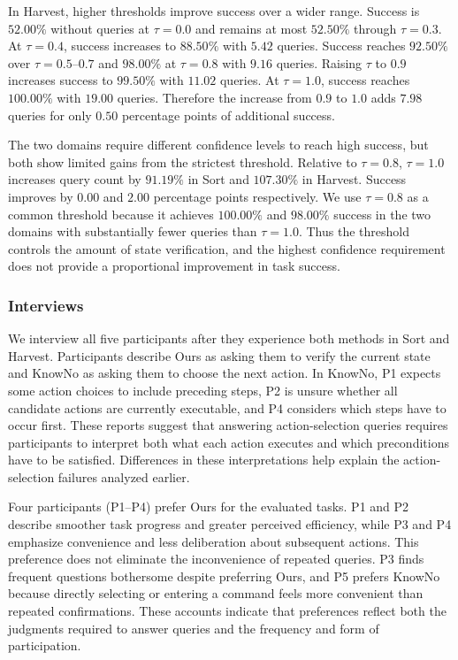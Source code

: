 In Harvest, higher thresholds improve success over a wider range. Success is $52.00\%$ without queries at $\tau=0.0$ and remains at most $52.50\%$ through $\tau=0.3$. At $\tau=0.4$, success increases to $88.50\%$ with $5.42$ queries. Success reaches $92.50\%$ over $\tau=0.5$--$0.7$ and $98.00\%$ at $\tau=0.8$ with $9.16$ queries. Raising $\tau$ to $0.9$ increases success to $99.50\%$ with $11.02$ queries. At $\tau=1.0$, success reaches $100.00\%$ with $19.00$ queries. Therefore the increase from $0.9$ to $1.0$ adds $7.98$ queries for only $0.50$ percentage points of additional success.

The two domains require different confidence levels to reach high success, but both show limited gains from the strictest threshold. Relative to $\tau=0.8$, $\tau=1.0$ increases query count by $91.19\%$ in Sort and $107.30\%$ in Harvest. Success improves by $0.00$ and $2.00$ percentage points respectively. We use $\tau=0.8$ as a common threshold because it achieves $100.00\%$ and $98.00\%$ success in the two domains with substantially fewer queries than $\tau=1.0$. Thus the threshold controls the amount of state verification, and the highest confidence requirement does not provide a proportional improvement in task success.

\subsubsection{Interviews}\label{exp:interviews}
We interview all five participants after they experience both methods in Sort and Harvest. Participants describe Ours as asking them to verify the current state and KnowNo as asking them to choose the next action. In KnowNo, P1 expects some action choices to include preceding steps, P2 is unsure whether all candidate actions are currently executable, and P4 considers which steps have to occur first. These reports suggest that answering action-selection queries requires participants to interpret both what each action executes and which preconditions have to be satisfied. Differences in these interpretations help explain the action-selection failures analyzed earlier.

Four participants (P1--P4) prefer Ours for the evaluated tasks. P1 and P2 describe smoother task progress and greater perceived efficiency, while P3 and P4 emphasize convenience and less deliberation about subsequent actions. This preference does not eliminate the inconvenience of repeated queries. P3 finds frequent questions bothersome despite preferring Ours, and P5 prefers KnowNo because directly selecting or entering a command feels more convenient than repeated confirmations. These accounts indicate that preferences reflect both the judgments required to answer queries and the frequency and form of participation.

